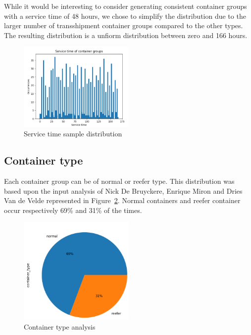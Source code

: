 \documentclass{article}
\begin{document}
While it would be interesting to consider generating consistent container
groups with a service time of 48 hours, we chose to simplify the distribution
due to the larger number of transshipment container groups compared to the
other types. The resulting distribution is a unfiorm distribution between zero
and 166 hours.

\begin{figure}
    \centering
    \includegraphics[width=0.5\textwidth]{fig/service time analysis.png}
    \caption{Service time sample distribution}\label{fig: service sample distribution}
\end{figure}

\subsection{Container type}
Each container group can be of normal or reefer type. This distribution was
based upon the input analysis of Nick De Bruyckere, Enrique Miron and Dries Van
de Velde represented in Figure~\ref{fig:container type analysis}. Normal
containers and reefer container occur respectively 69\% and 31\% of the times.

\begin{figure}
    \centering
    \includegraphics[width=0.5\textwidth]{fig/container_type.png}
    \caption{Container type analysis}\label{fig:container type analysis}
\end{figure}
\end{document}
